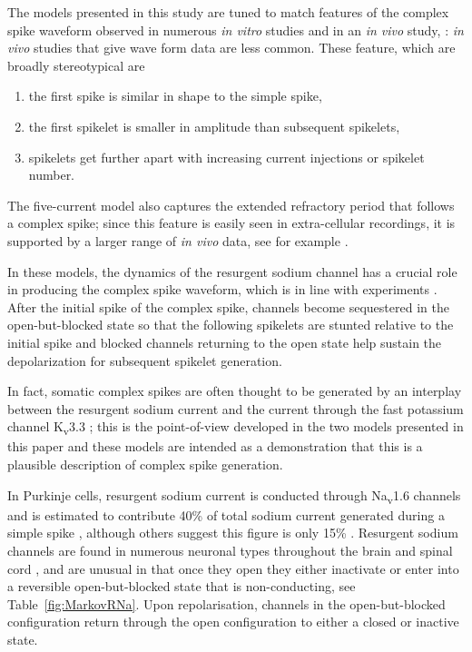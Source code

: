\documentclass[twocolumn]{svjour3}          %
\begin{document}
The models presented in this study are tuned to match features of the
complex spike waveform observed in numerous \textsl{in vitro} studies
\citep{ZaghaEtAl2008,zhang2017ethanol,MonsivaisEtAl2005,khaliq2005axonal}
and in an \textsl{in vivo} study, \citet{WarnaarEtAl2015}: \textsl{in
  vivo} studies that give wave form data are less common. These
feature, which are broadly stereotypical are
\begin{enumerate}
\item the first spike is similar in shape to the simple spike,
\item the first spikelet is smaller in amplitude than subsequent spikelets,
\item spikelets get further apart with increasing current injections or spikelet number.
\end{enumerate}
The five-current model also captures the extended refractory period
that follows a complex spike; since this feature is easily seen in
extra-cellular recordings, it is supported by a larger range of
\textsl{in vivo} data, see for example
\citet{GranitPhillips1956,LathamPaul1970,BloedelRoberts1971,ArmstrongRawson1979,BausweinEtAl1983,SatoEtAl1992,BurroughsEtAl2016}.

In these models, the dynamics of the resurgent sodium channel has a
crucial role in producing the complex spike waveform, which is in line
with experiments
\citep{RamanBean1997,NolanEtAl2003,KhaliqRaman2006}. After the initial
spike of the complex spike, channels become sequestered in the
open-but-blocked state so that the following spikelets are stunted
relative to the initial spike and blocked channels returning to the
open state help sustain the depolarization for subsequent spikelet
generation.

In fact, somatic complex spikes are often thought to be generated by
an interplay between the resurgent sodium current
\citep{RamanBean1997,RamanBean2001,KhaliqEtAl2003,KhaliqRaman2006} and
the current through the fast potassium channel K\textsubscript{v}3.3
\citep{ZaghaEtAl2008,HurlockEtAl2008,VeysEtAl2013}; this is the
point-of-view developed in the two models presented in this paper and
these models are intended as a demonstration that this is a plausible
description of complex spike generation.

In Purkinje cells, resurgent sodium current is conducted through
Na\textsubscript{v}1.6 channels \citep{RamanBean1997} and is estimated
to contribute 40\% of total sodium current generated during a simple
spike \citep{RamanBean2001}, although others suggest this figure is
only 15\% \citep{LevinEtAl2006}. Resurgent sodium channels are found
in numerous neuronal types throughout the brain and spinal cord
\citep{OsorioEtAl2010}, and are unusual in that once they open they
either inactivate or enter into a reversible open-but-blocked state
that is non-conducting, see Table~\ref{fig:MarkovRNa}. Upon
repolarisation, channels in the open-but-blocked configuration return
through the open configuration to either a closed or inactive state.
\end{document}
